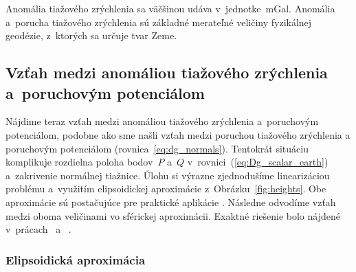 \documentclass[a4paper, 12pt]{book}
\begin{document}
Anomália tiažového zrýchlenia sa väčšinou udáva v~jednotke~mGal.  Anomália 
a~porucha tiažového zrýchlenia sú základné merateľné veličiny fyzikálnej 
geodézie, z~ktorých sa určuje tvar Zeme.

\subsection{Vzťah medzi anomáliou tiažového zrýchlenia a~poruchovým 
potenciálom}

Nájdime teraz vzťah medzi anomáliou tiažového zrýchlenia a~poruchovým 
potenciálom, podobne ako sme našli vzťah medzi poruchou tiažového zrýchlenia 
a poruchovým potenciálom (rovnica~\ref{eq:dg_normals}).  Tentokrát situáciu 
komplikuje rozdielna poloha bodov~$P$ a~$Q$ 
v~rovnici~(\ref{eq:Dg_scalar_earth}) a~zakrivenie normálnej tiažnice.  Úlohu si 
výrazne zjednodušíme linearizáciou problému a~využitím elipsoidickej 
aproximácie z~Obrázku~\ref{fig:heights}.  Obe aproximácie sú postačujúce pre 
praktické aplikácie \parencite{MoritzAdvancedGeodesy}.  Následne odvodíme vzťah 
medzi oboma veličinami vo sférickej aproximácii.  Exaktné riešenie bolo nájdené 
v~prácach~\textcite{Meissl1971b} a~\textcite{Borre_chapter8} \parencite[pozri 
tiež napríklad][]{MoritzAdvancedGeodesy,Janak2006}.

\subsubsection{Elipsoidická aproximácia}
\end{document}
